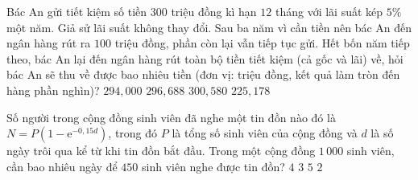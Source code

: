 

\begin{ex}%
	Bác An gửi tiết kiệm số tiền $300$ triệu đồng kì hạn $12$ tháng với lãi suất kép $5\%$ một năm. Giả sử lãi suất không thay đổi. Sau ba năm vì cần tiền nên bác An đến ngân hàng rút ra $100$ triệu đồng, phần còn lại vẫn tiếp tục  gửi. Hết bốn năm tiếp theo, bác An lại đến ngân hàng rút toàn bộ tiền tiết kiệm (cả gốc và lãi) về, hỏi bác An sẽ thu về được bao nhiêu tiền (đơn vị: triệu đồng, kết quả làm tròn đến hàng phần nghìn)?
	 \choice
		 {$294{,}000$}
		 {$296{,}688$}
		 {\True $300{,}580$}
		{$225{,}178$} 
\end{ex}

\begin{ex}%
	Số người trong cộng đồng sinh viên  đã nghe một tin đồn nào đó là $N=P\left(1-\mathrm{e}^{-0{,}15d}\right)$, trong đó $P$ là tổng số sinh viên của cộng đồng và $d$ là số ngày trôi qua kể từ khi tin đồn bắt đầu. Trong một cộng đồng $1\,000$ sinh viên, cần bao nhiêu ngày để $450$ sinh viên nghe được tin đồn?
	\choice 
		 {\True $4$}
		{$3$} 
		 {$5$}
		{$2$} 
\end{ex}

